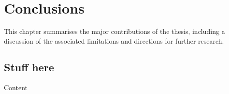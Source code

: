 
\chapter{Conclusions}\label{c:conclusions}


\begin{synopsis}
This chapter summarises the major contributions of the thesis, including a discussion of the associated limitations and directions for further research.
\end{synopsis}


\section{Stuff here}

Content

